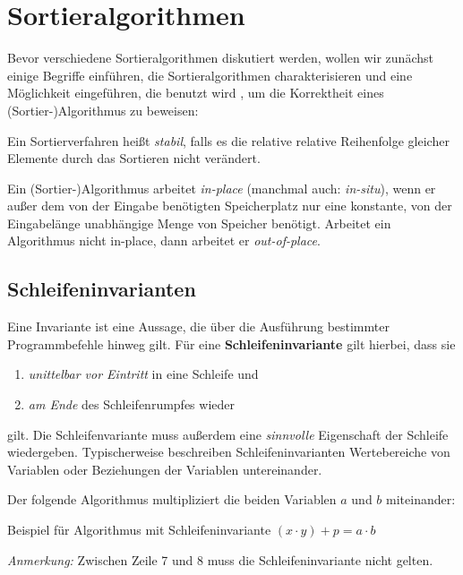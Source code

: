 \section{Sortieralgorithmen}
Bevor verschiedene Sortieralgorithmen diskutiert werden, wollen wir zunächst einige Begriffe einführen, die Sortieralgorithmen charakterisieren und eine Möglichkeit eingeführen, die benutzt wird , um die Korrektheit eines (Sortier-)Algorithmus zu beweisen:

\begin{defi}
  Ein Sortierverfahren heißt \emph{stabil}, falls es die relative relative Reihenfolge gleicher Elemente durch das Sortieren nicht verändert.
\end{defi}

\begin{defi}
  Ein (Sortier-)Algorithmus arbeitet \emph{in-place} (manchmal auch: \emph{in-situ}), wenn er außer dem von der Eingabe benötigten Speicherplatz nur eine konstante, von der Eingabelänge unabhängige Menge von Speicher benötigt. Arbeitet ein Algorithmus nicht in-place, dann arbeitet er \emph{out-of-place}.
\end{defi}

\subsection{Schleifeninvarianten}
Eine Invariante ist eine Aussage, die über die Ausführung bestimmter Programmbefehle hinweg gilt. Für eine \textbf{Schleifeninvariante} gilt hierbei, dass sie
\begin{enumerate}
	\item \emph{unittelbar vor Eintritt} in eine Schleife und
	\item \emph{am Ende} des Schleifenrumpfes wieder
\end{enumerate}
gilt. Die Schleifenvariante muss außerdem eine \emph{sinnvolle} Eigenschaft der Schleife wiedergeben. Typischerweise beschreiben Schleifeninvarianten Wertebereiche von Variablen oder Beziehungen der Variablen untereinander.

\begin{bsp}
	Der folgende Algorithmus multipliziert die beiden Variablen $a$ und $b$ miteinander:
	\begin{algorithm}[H]
		\caption{Beispiel für Algorithmus mit Schleifeninvariante $(x \cdot y) + p = a \cdot b$}
		\begin{algorithmic}[1]
			 
			\State{} 
			\State{} 
			\EndWhile
			\State{} 
			\State {}
			\EndProcedure
		\end{algorithmic}
	\end{algorithm}
	\emph{Anmerkung:} Zwischen Zeile 7 und 8 muss die Schleifeninvariante nicht gelten.
\end{bsp}

